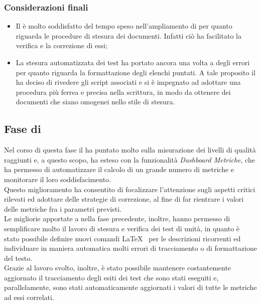 \subsubsection{Considerazioni finali}
\begin{itemize}
\item Il  è molto soddisfatto del tempo speso nell'ampliamento di \pragmadb per quanto riguarda le procedure di stesura dei documenti. Infatti ciò ha facilitato la verifica e la correzione di essi;
\item La stesura automatizzata dei test ha portato ancora una volta a degli errori per quanto riguarda la formattazione degli elenchi puntati. A tale proposito il  ha deciso di rivedere gli script associati e si è impegnato ad adottare una procedura più ferrea e precisa nella scrittura, in modo da ottenere dei documenti che siano omogenei nello stile di stesura.
\end{itemize}
\subsection{Fase di \fCt}
Nel corso di questa fase il  ha puntato molto sulla misurazione dei livelli di qualità raggiunti e, a questo scopo, ha esteso \pragmadb con la funzionalità \textit{Dashboard Metriche}, che ha permesso di automatizzare il calcolo di un grande numero di metriche e monitorare il loro soddisfacimento.\\
Questo miglioramento ha consentito di focalizzare l'attenzione sugli aspetti critici rilevati ed adottare delle strategie di correzione, al fine di far rientrare i valori delle metriche fra i parametri previsti.\\
Le migliorie apportate a \pragmadb nella fase precedente, inoltre, hanno permesso di semplificare molto il lavoro di stesura e verifica dei test di unità, in quanto è stato possibile definire nuovi comandi \LaTeX~ per le descrizioni ricorrenti ed individuare in maniera automatica molti errori di tracciamento o di formattazione del testo.\\
Grazie al lavoro svolto, inoltre, è stato possibile mantenere costantemente aggiornato il tracciamento degli esiti dei test che sono stati eseguiti e, parallelamente, sono stati automaticamente aggiornati i valori di tutte le metriche ad essi correlati.
